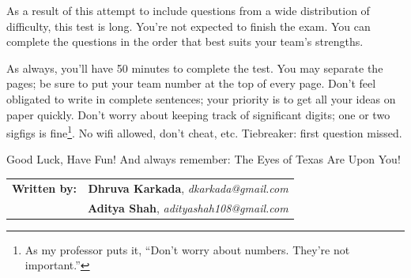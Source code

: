 \documentclass{exam}
\begin{document}
\begin{coverpages}
	\par As a result of this attempt to include questions from a wide distribution of difficulty, this test is long. You're not expected to finish the exam. You can complete the questions in the order that best suits your team's strengths.
	\par As always, you’ll have 50 minutes to complete the test. You may separate the pages; be sure to put your team number at the top of every page. Don’t feel obligated to write in complete sentences; your priority is to get all your ideas on paper quickly. Don't worry about keeping track of significant digits; one or two sigfigs is fine\footnote{As my professor puts it, ``Don't worry about numbers. They're not important.''}. No wifi allowed, don't cheat, etc. Tiebreaker: first question missed.
	\par Good Luck, Have Fun! And always remember: The Eyes of Texas Are Upon You!
		\vspace{0.10 in}
	\begin{center}
		\vspace{0.05 in}
		\par
		\def\arraystretch{2}\tabcolsep=3pt
		\begin{tabular}{r r}
			\textbf{{Written by:}}
			 & \textbf{Dhruva Karkada}, \textit{ dkarkada@gmail.com} \\
			 & \textbf{Aditya Shah}, \textit{ adityashah108@gmail.com} \\
		\end{tabular}
		\vspace{0.05 in}
	\end{center}
\end{coverpages}
\end{document}

